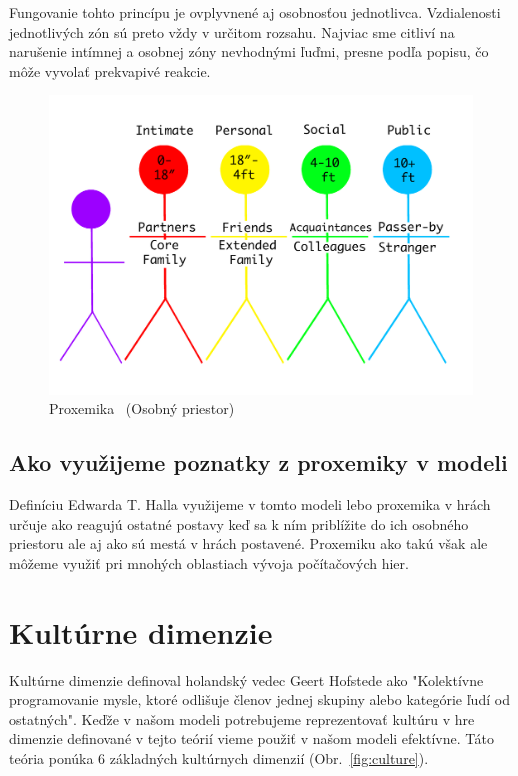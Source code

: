 \documentclass[10pt,twoside,slovak,a4paper]{article}
\begin{document}
Fungovanie tohto princípu je ovplyvnené aj osobnosťou jednotlivca. Vzdialenosti jednotlivých
zón sú preto vždy v určitom rozsahu. Najviac sme citliví na narušenie intímnej a osobnej zóny
nevhodnými ľuďmi, presne podľa popisu, čo môže vyvolať prekvapivé reakcie.

\begin{figure}[H]
	\centering
	\includegraphics[scale=0.34]{Obrázky/Proxemics.png}
	\caption{Proxemika~\cite{hall1966the} (Osobný priestor)}
	\label{fig:proxemics}
\end{figure}


\subsection{Ako využijeme poznatky z proxemiky v modeli}\label{proxemika:poznatky}

Definíciu Edwarda T. Halla využijeme v tomto modeli lebo proxemika v hrách určuje ako reagujú
ostatné postavy keď sa k ním priblížite do ich osobného priestoru ale aj ako sú mestá v hrách
postavené. Proxemiku ako takú však ale môžeme využiť pri mnohých oblastiach vývoja počítačových
hier.

\pagebreak

\section{Kultúrne dimenzie}\label{kultura} 

Kultúrne dimenzie definoval holandský vedec Geert Hofstede ako \cite{hofstede2010cultures}
"Kolektívne programovanie mysle, ktoré odlišuje členov jednej skupiny alebo kategórie ľudí
od ostatných". Keďže v našom modeli potrebujeme reprezentovať kultúru v hre dimenzie definované
v tejto teórií vieme použiť v našom modeli efektívne. Táto teória ponúka 6 základných kultúrnych
dimenzií (Obr.~\ref{fig:culture}).
\end{document}
